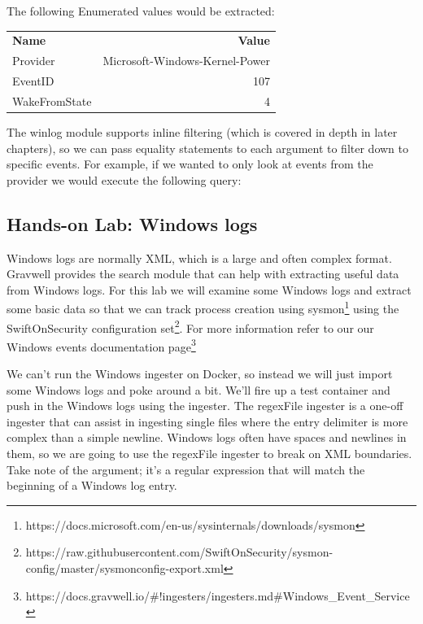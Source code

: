 
The following Enumerated values would be extracted:

\begin{longtable}[]{lr}
\toprule
\endhead
\textbf{Name} & \textbf{Value} \\
{Provider} & {Microsoft-Windows-Kernel-Power} \\
{EventID} & {107} \\
{WakeFromState} & {4} \\
\bottomrule
\end{longtable}

The winlog module supports inline filtering (which is covered in depth
in later chapters), so we can pass equality statements to each argument to
filter down to specific events. For example, if we wanted to only look
at events from the  provider we would
execute the following query:


\subsection{Hands-on Lab: Windows logs}

Windows logs are normally XML, which is a large and often complex
format. Gravwell provides the  search module that can help
with extracting useful data from Windows logs. For this lab we will
examine some Windows logs and extract some basic data so that we can
track process creation using
sysmon\footnote{https://docs.microsoft.com/en-us/sysinternals/downloads/sysmon} using the
SwiftOnSecurity configuration
set\footnote{https://raw.githubusercontent.com/SwiftOnSecurity/sysmon-config/master/sysmonconfig-export.xml}. For more information refer to our our Windows events documentation
page\footnote{https://docs.gravwell.io/\#!ingesters/ingesters.md\#Windows\_Event\_Service}

We can't run the Windows ingester on Docker, so instead we will just
import some Windows logs and poke around a bit. We'll fire up a test
container and push in the Windows logs using the  ingester.
The regexFile ingester is a one-off ingester that can assist in
ingesting single files where the entry delimiter is more complex than a simple newline.
Windows logs often have spaces and newlines in them, so we are going to use
the regexFile ingester to break on XML boundaries. Take note of the
 argument; it's a regular expression that will match the
beginning of a Windows log entry.

